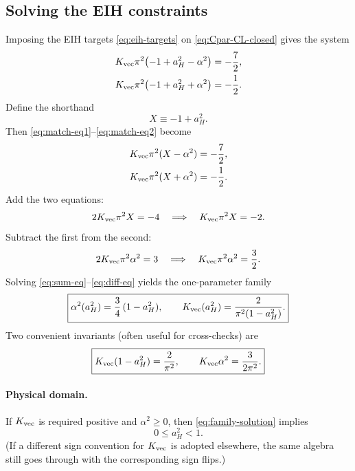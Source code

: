 \documentclass[11pt]{article}
\begin{document}
\subsection{Solving the EIH constraints}
Imposing the EIH targets \eqref{eq:eih-targets} on \eqref{eq:Cpar-CL-closed} gives the system
\begin{align}
K_{\rm vec}\pi^2\bigl(-1+a_H^2-\alpha^2\bigr) &= -\frac{7}{2},
\label{eq:match-eq1}\\
K_{\rm vec}\pi^2\bigl(-1+a_H^2+\alpha^2\bigr) &= -\frac{1}{2}.
\label{eq:match-eq2}
\end{align}
Define the shorthand
\begin{equation}
X \equiv -1+a_H^2.
\label{eq:def-X}
\end{equation}
Then \eqref{eq:match-eq1}--\eqref{eq:match-eq2} become
\begin{align}
K_{\rm vec}\pi^2(X-\alpha^2) &= -\frac{7}{2},
\\
K_{\rm vec}\pi^2(X+\alpha^2) &= -\frac{1}{2}.
\end{align}
Add the two equations:
\begin{equation}
2K_{\rm vec}\pi^2 X = -4
\quad\Longrightarrow\quad
K_{\rm vec}\pi^2 X = -2.
\label{eq:sum-eq}
\end{equation}
Subtract the first from the second:
\begin{equation}
2K_{\rm vec}\pi^2 \alpha^2 = 3
\quad\Longrightarrow\quad
K_{\rm vec}\pi^2\alpha^2=\frac{3}{2}.
\label{eq:diff-eq}
\end{equation}
Solving \eqref{eq:sum-eq}--\eqref{eq:diff-eq} yields the one-parameter family
\begin{equation}
\boxed{
\alpha^2(a_H^2)=\frac{3}{4}\,(1-a_H^2),
\qquad
K_{\rm vec}(a_H^2)=\frac{2}{\pi^2(1-a_H^2)}.
}
\label{eq:family-solution}
\end{equation}
Two convenient invariants (often useful for cross-checks) are
\begin{equation}
\boxed{
K_{\rm vec}(1-a_H^2)=\frac{2}{\pi^2},
\qquad
K_{\rm vec}\alpha^2=\frac{3}{2\pi^2}.
}
\label{eq:family-invariants}
\end{equation}

\paragraph{Physical domain.}
If \(K_{\rm vec}\) is required positive and \(\alpha^2\ge 0\), then \eqref{eq:family-solution}
implies
\begin{equation}
0\le a_H^2 < 1.
\label{eq:aH-domain}
\end{equation}
(If a different sign convention for \(K_{\rm vec}\) is adopted elsewhere, the same algebra still
goes through with the corresponding sign flips.)
\end{document}
